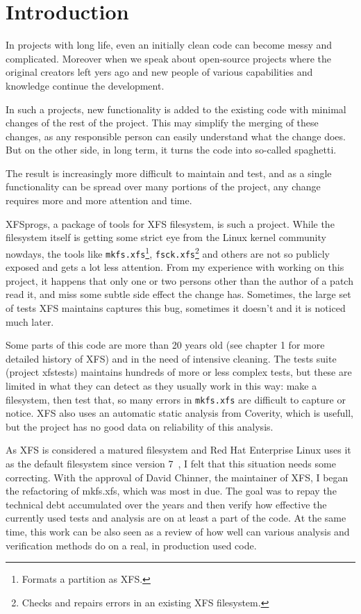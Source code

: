 
\chapter{Introduction}\label{chap:introduction}


In projects with long life, even an initially clean code can become messy and complicated. Moreover when we speak about open-source projects where the original creators left yers ago and new people of various capabilities and knowledge continue the development.

In such a projects, new functionality is added to the existing code with minimal changes of the rest of the project. This may simplify the merging of these changes, as any responsible person can easily understand what the change does. But on the other side, in long term, it turns the code into so-called spaghetti.

The result is increasingly more difficult to maintain and test, and as a single functionality can be spread over many portions of the project, any change requires more and more attention and time.

XFSprogs, a package of tools for XFS filesystem, is such a project. While the filesystem itself is getting some strict eye from the Linux kernel community nowdays, the tools like {\tt mkfs.xfs}\footnote{Formats a partition as XFS.}, {\tt fsck.xfs}\footnote{Checks and repairs errors in an existing XFS filesystem.} and others are not so publicly exposed and gets a lot less attention. From my experience with working on this project, it happens that only one or two persons other than the author of a patch read it, and miss some subtle side effect the change has. Sometimes, the large set of tests XFS maintains captures this bug, sometimes it doesn't and it is noticed much later.

Some parts of this code are more than 20 years old (see chapter 1 for more detailed history of XFS) and in the need of intensive cleaning. The tests suite (project xfstests) maintains hundreds of more or less complex tests, but these are limited in what they can detect as they usually work in this way: make a filesystem, then test that, so many errors in {\tt mkfs.xfs} are difficult to capture or notice. XFS also uses an automatic static analysis from Coverity, which is usefull, but the project has no good data on reliability of this analysis.

As XFS is considered a matured filesystem and Red Hat Enterprise Linux uses it as the default filesystem since version 7~\cite{RHEL7XFS}, I felt that this situation needs some correcting. With the approval of David Chinner, the maintainer of XFS, I began the refactoring of mkfs.xfs, which was most in due. The goal was to repay the technical debt accumulated over the years and then verify how effective the currently used tests and analysis are on at least a part of the code. At the same time, this work can be also seen as a review of how well can various analysis and verification methods do on a real, in production used code.

